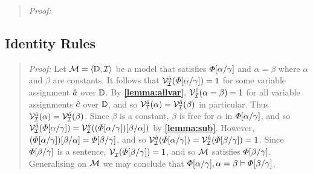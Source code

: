 \label{rule:ExistE}

\begin{quote} 
  \textit{Proof:} %
\end{quote}







\subsection{Identity Rules}%
  \label{sub:IdentityRules}
  


\label{box:Lemma13}

\begin{quote} 
  \textit{Proof:} Let $\mathcal{M}=\langle\mathbb{D},\mathcal{I}\rangle$ be a model that satisfies $\varPhi[\alpha/\gamma]$ and $\alpha = \beta$ where $\alpha$ and $\beta$ are constants. 
  It follows that $\mathcal{V}_{\mathcal{I}}^{\hat{a}}(\varPhi[\alpha/\gamma])=1$ for some variable assignment $\hat{a}$ over $\mathbb{D}$.
  By \textbf{\ref{lemma:allvar}}, $\mathcal{V}_{\mathcal{I}}^{\hat{c}}(\alpha=\beta)=1$ for all variable assignments $\hat{c}$ over $\mathbb{D}$, and so $\mathcal{V}_{\mathcal{I}}^{\hat{a}}(\alpha)=\mathcal{V}_{\mathcal{I}}^{\hat{a}}(\beta)$ in particular.
  Thus $\mathcal{V}_{\mathcal{I}}^{\hat{a}}(\alpha)=\mathcal{V}_{\mathcal{I}}^{\hat{a}}(\beta)$.
  Since $\beta$ is a constant, $\beta$ is free for $\alpha$ in $\varPhi[\alpha/\gamma]$, and so $\mathcal{V}_{\mathcal{I}}^{\hat{a}}(\varPhi[\alpha/\gamma])=\mathcal{V}_{\mathcal{I}}^{\hat{a}}((\varPhi[\alpha/\gamma])[\beta/\alpha])$ by \textbf{\ref{lemma:sub}}.
  However, $(\varPhi[\alpha/\gamma])[\beta/\alpha]=\varPhi[\beta/\gamma]$, and so $\mathcal{V}_{\mathcal{I}}^{\hat{a}}(\varPhi[\alpha/\gamma])=\mathcal{V}_{\mathcal{I}}^{\hat{a}}(\varPhi[\beta/\gamma])=1$.
  Since $\varPhi[\beta/\gamma]$ is a sentence, $\mathcal{V}_{\mathcal{I}}^{}(\varPhi[\beta/\gamma])=1$, and so $\mathcal{M}$ satisfies $\varPhi[\beta/\gamma]$. 
  Generalising on $\mathcal{M}$ we may conclude that $\varPhi[\alpha/\gamma], \alpha = \beta \vDash \varPhi[\beta/\gamma]$. 
\end{quote}







